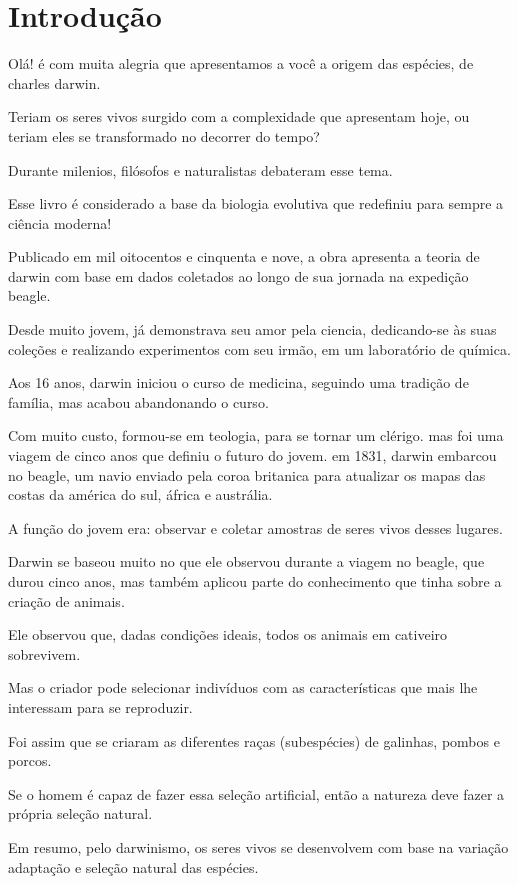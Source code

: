 \documentclass[12pt]{extarticle}
\begin{document}
\tableofcontents

\section{Introdução}

Olá! é com muita alegria que apresentamos a você a origem das espécies, de charles darwin.

Teriam os seres vivos surgido com a complexidade que apresentam hoje, ou teriam eles se transformado no decorrer do tempo?

Durante milenios, filósofos e naturalistas debateram esse tema.


Esse livro é considerado a base da biologia evolutiva que redefiniu para sempre a ciência moderna!

Publicado em mil oitocentos e cinquenta e nove, a obra apresenta a teoria de darwin com base em dados coletados ao longo de sua jornada na expedição beagle.

Desde muito jovem, já demonstrava seu amor pela ciencia,
dedicando-se às suas coleções e realizando experimentos  com seu irmão,  em um laboratório de química.

Aos 16 anos, darwin iniciou o curso de medicina,  seguindo uma tradição de família, mas acabou abandonando o curso.

Com muito custo, formou-se em teologia, para se tornar um clérigo.
mas foi uma viagem de cinco anos que definiu o futuro do jovem.
em 1831, darwin embarcou no beagle, um navio enviado pela coroa britanica para atualizar os mapas das costas da américa do sul,  áfrica e austrália.

A função do jovem era: observar e coletar amostras de seres vivos desses lugares.

Darwin se baseou  muito no que ele observou durante a viagem no beagle, que durou cinco anos, 
mas também aplicou parte do conhecimento que tinha sobre a criação de animais.

Ele observou que, dadas condições ideais, todos os animais em cativeiro sobrevivem.

Mas o criador pode selecionar indivíduos com as características que mais lhe interessam para se reproduzir.

Foi assim que se criaram as diferentes raças (subespécies) de galinhas, pombos e porcos.

Se o homem é capaz de fazer essa seleção artificial,
então a natureza deve fazer a própria seleção natural.

Em resumo, pelo darwinismo, os seres vivos se desenvolvem com base na variação adaptação e seleção natural das espécies.
\end{document}
